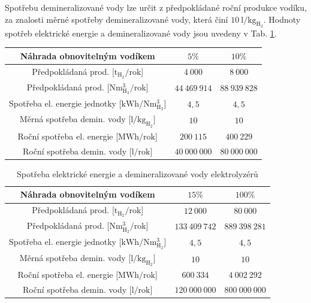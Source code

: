 \noindent
Spotřebu demineralizované vody lze určit z předpokládané roční produkce vodíku, za znalosti měrné spotřeby demineralizované vody, která činí $10\ \mathrm{l/kg_{H_2}}$. \cite{SiemensEnergy2020} Hodnoty spotřeb elektrické energie a demineralizované vody jsou uvedeny v Tab. \ref{tab:spotreby}.
\begin{table}[h!]
    \centering
    \begin{tabular}{|c|c|c|}
        \hline
        Náhrada obnovitelným vodíkem & $5\%$ & $10\%$\\ \hline
        Předpokládaná prod. [$\mathrm{t_{H_2}}/$rok] & $4\ 000$ & $8\ 000$\\ \hline
        Předpokládaná prod. [$\mathrm{Nm^3_{H_2}}/$rok] & $44\ 469\ 914$ & $88\ 939\ 828$\\ \hline\hline
        Spotřeba el. energie jednotky [$\mathrm{kWh/Nm^3_{H_2}}$] & $4,5$ & $4,5$\\ \hline\hline
        Měrná spotřeba demin. vody [$\mathrm{l/kg_{H_2}}$] & $10$ & $10$\\ \hline\hline
        Roční spotřeba el. energie [$\mathrm{MWh/rok}$] & $200\ 115$ & $400\ 229$ \\ \hline
        Roční spotřeba demin. vody [$\mathrm{l/rok}$] & $40\ 000\ 000$ & $80\ 000\ 000$\\ \hline
    \end{tabular}
\end{table}
\begin{table}[h!]
    \centering
    \begin{tabular}{|c|c|c|}
        \hline
        Náhrada obnovitelným vodíkem & $15\%$ & $100\%$\\ \hline
        Předpokládaná prod. [$\mathrm{t_{H_2}}/$rok] & $12\ 000$ & $80\ 000$\\ \hline
        Předpokládaná prod. [$\mathrm{Nm^3_{H_2}}/$rok] & $133\ 409\ 742$ & $889\ 398\ 281$\\ \hline\hline
        Spotřeba el. energie jednotky [$\mathrm{kWh/Nm^3_{H_2}}$] & $4,5$ & $4,5$ \\ \hline\hline
        Měrná spotřeba demin. vody [$\mathrm{l/kg_{H_2}}$]& $10$ & $10$ \\ \hline\hline
        Roční spotřeba el. energie [$\mathrm{MWh/rok}$] & $600\ 334$ & $4\ 002\ 292$ \\ \hline
        Roční spotřeba demin. vody [$\mathrm{l/rok}$] & $120\ 000\ 000$ & $800\ 000\ 000$ \\ \hline
    \end{tabular}
    \caption[Spotřeba elektrické energie a demineralizované vody elektrolyzérů]{Spotřeba elektrické energie a demineralizované vody elektrolyzérů}
    \label{tab:spotreby}
\end{table}

